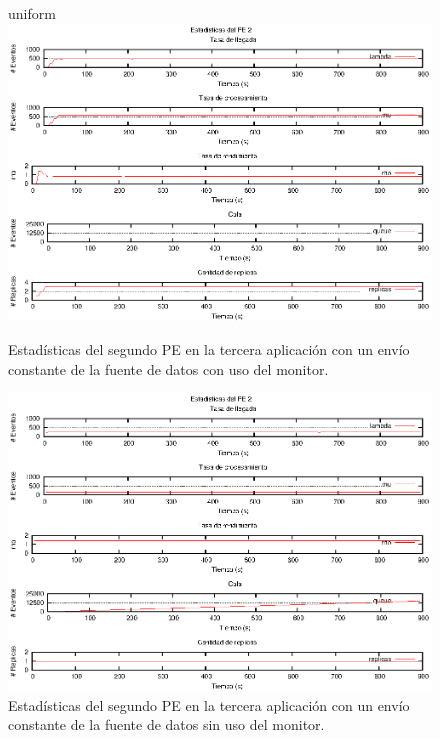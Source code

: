 \begin{figure}[!hptb]
\centering
  uniform  \includegraphics[scale=1.1]{images/exp/app3/cm/logical/statusTwoPE.eps}
    \caption{Estadísticas del segundo PE en la tercera aplicación con un envío constante de la fuente de datos con uso del monitor.}
    \label{fig:app3-statusTwoPE-cm}
\end{figure}

\begin{figure}[!hptb]
\centering
    \includegraphics[scale=1.1]{images/exp/app3/sm/logical/statusTwoPE.eps}
    \caption{Estadísticas del segundo PE en la tercera aplicación con un envío constante de la fuente de datos sin uso del monitor.}
    \label{fig:app3-statusTwoPE-sm}
\end{figure}

